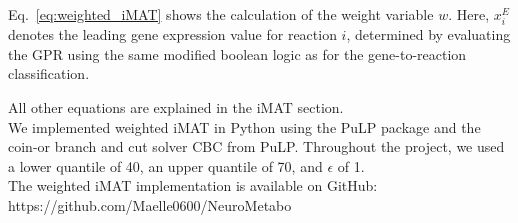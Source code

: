 Eq.~\ref{eq:weighted_iMAT} shows the calculation of the weight variable $w$. Here, $x_i^E$  denotes the leading gene expression value for reaction $i$, determined by evaluating the GPR using the same modified boolean logic as for the gene-to-reaction classification.

All other equations are explained in the iMAT section.
\\

We implemented weighted iMAT in Python using the PuLP package and the coin-or branch and cut solver \gls{CBC} from PuLP.
Throughout the project, we used a lower quantile of 40, an upper quantile of 70, and $\epsilon$ of 1.
\\

The weighted iMAT implementation is available on GitHub:\\
https://github.com/Maelle0600/NeuroMetabo
\endinput 